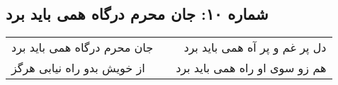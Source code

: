 \begin{center}
\section*{شماره ۱۰: جان محرم درگاه همی باید برد}
\label{sec:010}
\begin{longtable}{l p{0.5cm} r}
جان محرم درگاه همی باید برد
&&
دل پر غم و پر آه همی باید برد
\\
از خویش بدو راه نیابی هرگز
&&
هم زو سوی او راه همی باید برد
\\
\end{longtable}
\end{center}
